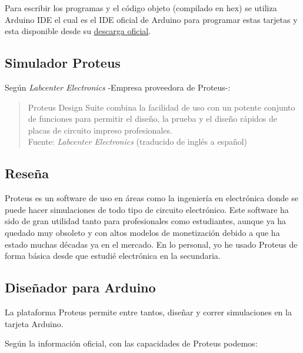 \documentclass{article}
\begin{document}
Para escribir los programas y el código objeto (compilado en hex) se utiliza Arduino IDE el cual es el IDE oficial de Arduino para programar estas tarjetas y esta disponible desde su \href{https://docs.arduino.cc/software/ide-v2/tutorials/getting-started/ide-v2-downloading-and-installing}{descarga oficial}.

\subsection{Simulador Proteus}

Según \textit{Labcenter Electronics}\cite{labcenter-electronics-2022} -Empresa proveedora de Proteus-:

\begin{quote}
    Proteus Design Suite combina la facilidad de uso con un potente conjunto de funciones para permitir el diseño, la prueba y el diseño rápidos de placas de circuito impreso profesionales.\\ \footnotesize
    Fuente: \textit{Labcenter Electronics} (traducido de inglés a español) \cite{labcenter-electronics-2022}
\end{quote}

\subsection{Reseña}

Proteus es un software de uso en áreas como la ingeniería en electrónica donde se puede hacer simulaciones de todo tipo de circuito electrónico. Este software ha sido de gran utilidad tanto para profesionales como estudiantes, aunque ya ha quedado muy obsoleto y con altos modelos de monetización debido a que ha estado muchas décadas ya en el mercado. En lo personal, yo he usado Proteus de forma básica desde que estudié electrónica en la secundaria.

\subsection{Diseñador para Arduino}

La plataforma Proteus permite entre tantos, diseñar y correr simulaciones en la tarjeta Arduino.

\bigbreak

Según la información oficial, con las capacidades de Proteus podemos:
\end{document}
